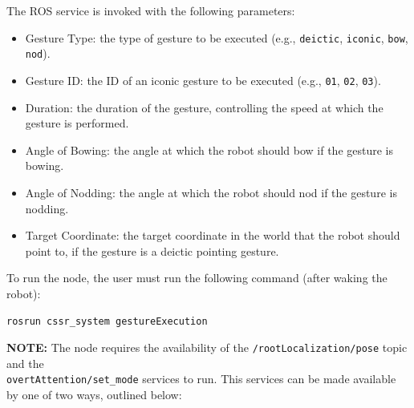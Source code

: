 \documentclass{CSSRforAfrica}
\begin{document}
The ROS service is invoked with the following parameters:
\begin{itemize}
	\item Gesture Type: the type of gesture to be executed (e.g., \texttt{deictic}, \texttt{iconic}, \texttt{bow}, \texttt{nod}).
	\item Gesture ID: the ID of an iconic gesture to be executed (e.g., \texttt{01}, \texttt{02}, \texttt{03}).
	\item Duration: the duration of the gesture, controlling the speed at which the gesture is performed.
	\item Angle of Bowing: the angle at which the robot should bow if the gesture is bowing.
	\item Angle of Nodding: the angle at which the robot should nod if the gesture is nodding.
	\item Target Coordinate: the target coordinate in the world that the robot should point to, if the gesture is a deictic pointing gesture.
\end{itemize}

\noindent To run the node, the user must run the following command (after waking the robot):


\begin{lstlisting}[style=withoutNumbering, language=bash]
rosrun cssr_system gestureExecution
\end{lstlisting}

{\color{red} 
\noindent \textbf{NOTE:} 
}
The node requires the availability of the \texttt{/rootLocalization/pose} topic and the \\ \texttt{overtAttention/set\_mode} services to run. This services can be made available by one of two ways, outlined below:
\end{document}
